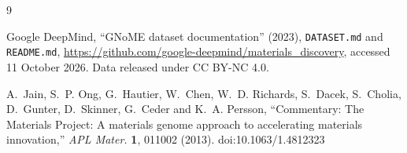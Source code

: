 \documentclass[11pt]{article}
\begin{document}
\begin{thebibliography}{9}

 Google DeepMind, ``GNoME dataset
documentation'' (2023), \texttt{DATASET.md} and \texttt{README.md}, \url{https://github.com/google-deepmind/materials_discovery},
accessed 11 October 2026. Data released under CC BY-NC 4.0.

 A.~Jain, S.~P. Ong, G.~Hautier, W.~Chen,
W.~D. Richards, S.~Dacek, S.~Cholia, D.~Gunter, D.~Skinner, G.~Ceder and K.~A. Persson,
``Commentary: The Materials Project: A materials genome approach to accelerating materials
innovation,'' \emph{APL Mater.} \textbf{1}, 011002 (2013). doi:10.1063/1.4812323

\end{thebibliography}
\end{document}
